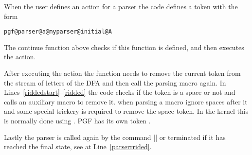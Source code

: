 \begin{teXXX}
\def\pgf@parser@cont{%
  \expandafter\let\expandafter\pgf@parser@action%
  \csname pgf@parser@a@\pgf@parser @\pgf@parser@state @\meaning\pgf@parser@symbol\endcsname%
  \ifx\pgf@parser@action\relax%
    \expandafter\let\expandafter\pgf@parser@action%
    \csname pgf@parser@a@\pgf@parser @all@\meaning\pgf@parser@symbol\endcsname%
    \ifx\pgf@parser@action\relax%
      \pgferror{Unexpected character
        '\meaning\pgf@parser@symbol' in parser '\pgf@parser' in state
        '\pgf@parser@state'}%
    \fi%
  \fi%
  \pgf@parser@action%
  \ifx\pgf@parser@symbol\pgfutil@sptoken(*@\label{riddedstart}@*)%
    \expandafter\pgf@parser@rid@space%
  \else%
    \expandafter\pgf@parser@rid@other%
  \fi(*@\label{ridded}@*)%
}
\end{teXXX}


When the user defines an action for a parser the code defines a token with the form

\texttt{pgf@parser@a@myparser@initial@\meaning A}

The continue function above checks if this function is defined, and then executes the action. 

After executing the action the function needs to remove the current token from the stream of letters of the DFA and then call the parsing macro again. In Lines~\ref{riddedstart}--\ref{ridded} the code checks if the token is a space or not and calls an auxiliary macro to remove it. \tex when parsing a macro ignore spaces after it and some special trickery is required to remove the space token. In the \latexe kernel this is normally done using \cmd{\sp@token}. PGF has its own token \cmd{\pgfutil@sptoken}.

\begin{teXXX}
{%
  \def\:{\pgf@parser@rid@space} \expandafter\gdef\: {\futurelet\pgf@parser@ignore\pgf@parser@ridded}
  \gdef\pgf@parser@rid@other{\afterassignment\pgf@parser@ridded\let\pgf@parser@ignore=}  
}
\end{teXXX}

Lastly the parser is called again by the command |\pgf@parser@ridded| or terminated if it has reached the final state, see \cmd{\pgf@parser@ridded} at Line~\ref{parserrrided}.

\begin{teXXX}
\def\pgf@parser@ridded{(*@\label{parserrrided}@*)%
  \ifx\pgf@parser@state\pgf@parser@final@text%
  \else%
    \expandafter\pgf@parser@parse%
  \fi%
}
\end{teXXX}

